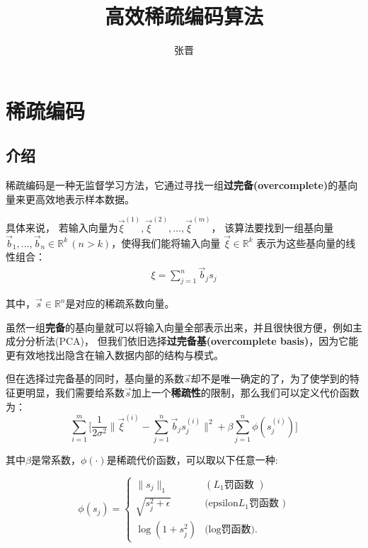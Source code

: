 
\usepackage{paralist}
\usepackage{minted}
\newtheorem{lemma}{引理}[section]
\title{高效稀疏编码算法}
\author{张晋}

\maketitle

\section{稀疏编码}
\subsection{介绍}
稀疏编码是一种无监督学习方法，它通过寻找一组\textbf{过完备(overcomplete)}的基向量来更高效地表示样本数据。

具体来说，
若输入向量为$\vec{\xi}^ {(1)},\vec{\xi}^ {(2)},\ldots,\vec{\xi}^{(m)}$，
该算法要找到一组基向量$ \vec{b}_1,\ldots,\vec{b}_n\in\mathbb{R}^k \,(n>k)$，使得我们能将输入向量 $\vec{\xi}\in\mathbb{R}^k$ 表示为这些基向量的线性组合：
\begin{align}
\xi = \sum_{j=1}^n \vec{b}_j s_j
\end{align}

其中，$\vec{s}\in \mathbb{R}^n$是对应的稀疏系数向量。

虽然一组\textbf{完备}的基向量就可以将输入向量全部表示出来，并且很快很方便，例如主成分分析法(PCA)，
但我们依旧选择\textbf{过完备基(overcomplete basis)}，因为它能更有效地找出隐含在输入数据内部的结构与模式。

但在选择过完备基的同时，基向量的系数$\vec{s}$却不是唯一确定的了，为了使学到的特征更明显，我们需要给系数$\vec{s}$加上一个\textbf{稀疏性}的限制，那么我们可以定义代价函数为：
\begin{equation}\label{cost}
  \sum_{i=1}^{m} \Big[\frac{1}{2\sigma^2}\| \vec{\xi}^{(i)} - \sum_{j=1}^n \vec{b}_j s_j^{(i)}\|^2+ \beta \sum_{j=1}^{n}\phi(s_j^{(i)})\Big]
\end{equation}

其中$\beta$是常系数，$\phi(\cdot)$是稀疏代价函数，可以取以下任意一种:

\[\phi(s_j)=\begin{cases}
      \|s_j\|_1 & (\mbox{$L_1$罚函数 })  \\
      \sqrt{s_j^2+\epsilon} & \mbox{(epsilon$L_1$罚函数 )}  \\
      \log(1+s_j^2) & \mbox{(log罚函数)}.
    \end{cases}\]


